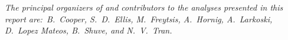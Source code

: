 
\emph{The principal organizers of and contributors to the analyses presented in this report are:~B.~Cooper, S.~D.~Ellis, M.~Freytsis, A.~Hornig, A.~Larkoski, D.~Lopez Mateos, B.~Shuve, and N.~V.~Tran.}
